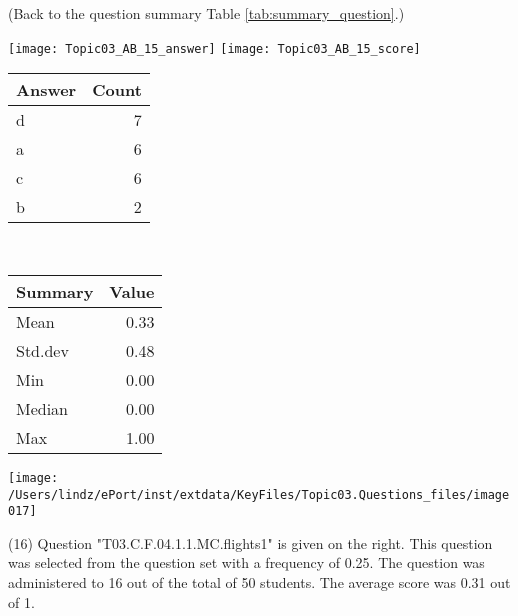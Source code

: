 \documentclass[12pt,english,nohyper]{tufte-handout}\usepackage[]{graphicx}\usepackage[]{color}
\begin{document}
 (Back to the question summary Table \ref{tab:summary_question}.)

\begin{center} \texttt{[image: Topic03\_AB\_15\_answer]} \texttt{[image: Topic03\_AB\_15\_score]} \end{center} 

\begin{center}%
\begin{tabular}{lr}
  \hline
Answer & Count \\ 
  \hline
d &   7 \\ 
  a &   6 \\ 
  c &   6 \\ 
  b &   2 \\ 
   \hline
\end{tabular}
~~~~~~~~%
\begin{tabular}{lr}
  \hline
Summary & Value \\ 
  \hline
Mean & 0.33 \\ 
  Std.dev & 0.48 \\ 
  Min & 0.00 \\ 
  Median & 0.00 \\ 
  Max & 1.00 \\ 
   \hline
\end{tabular}
\end{center}\newpage{}



\vspace{4cm}\begin{marginfigure}\texttt{[image: /Users/lindz/ePort/inst/extdata/KeyFiles/Topic03.Questions\_files/image017]}\end{marginfigure}\vspace{-4cm} (16) Question "T03.C.F.04.1.1.MC.flights1" is given on the right. This question was selected from the question set with a frequency of 0.25. The question was administered to 16 out of the total of 50 students. The average score was 0.31 out of 1.
\end{document}
